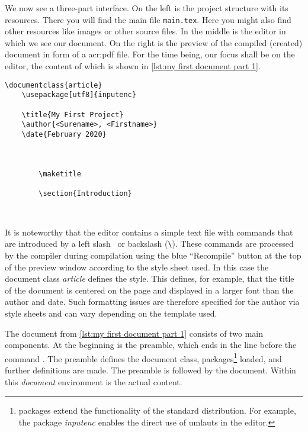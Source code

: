 We now see a three-part interface. On the left is the project structure with its resources. There you will find the main file \verb|main.tex|. Here you might also find other resources like images or other source files. In the middle is the editor in which we see our \Latex document. On the right is the preview of the compiled (\ie created) \Latex document in form of a \ac{acr:pdf} file. For the time being, our focus shall be on the editor, the content of which is shown in \autoref{lst:my first document part 1}.

\begin{lstlisting}[caption={My first \Latex Document, Part 1 \label{lst:my first document part 1}}, float]
	\documentclass{article}
	\usepackage[utf8]{inputenc}
	
	\title{My First Project}
	\author{<Surename>, <Firstname>}
	\date{February 2020}
	
	
		
		\maketitle
		
		\section{Introduction}
		
	
\end{lstlisting}

It is noteworthy that the editor contains a simple text file with commands that are introduced by a left slash \ or backslash (\verb|\|). These commands are processed by the compiler during compilation using the blue \enquote{Recompile} button at the top of the preview window according to the style sheet used. In this case the document class \textit{article} defines the style. This defines, for example, that the title of the document is centered on the page and displayed in a larger font than the author and date. Such formatting issues are therefore specified for the author via style sheets and can vary depending on the template used.

The \Latex document from \autoref{lst:my first document part 1} consists of two main components. At the beginning is the preamble, which ends in the line before the command \lstinline||. The preamble defines the document class, packages\footnote{packages extend the functionality of the standard \Latex distribution. For example, the package \textit{inputenc} enables the direct use of umlauts in the editor.} loaded, and further definitions are made. The preamble is followed by the document. Within this \textit{document} environment is the actual content.

